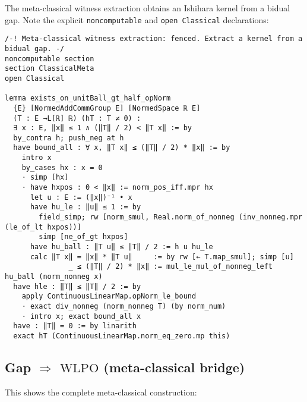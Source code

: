 \documentclass[11pt]{article}
\newcommand{\WLPO}{\mathrm{WLPO}}
\begin{document}
The meta-classical witness extraction obtains an Ishihara kernel from a bidual gap. Note the explicit \texttt{noncomputable} and \texttt{open Classical} declarations:

\begin{lstlisting}[caption={Meta-classical witness extraction from a bidual gap},label={lst:producer}]
/-! Meta-classical witness extraction: fenced. Extract a kernel from a bidual gap. -/
noncomputable section
section ClassicalMeta
open Classical

lemma exists_on_unitBall_gt_half_opNorm
  {E} [NormedAddCommGroup E] [NormedSpace ℝ E]
  (T : E →L[ℝ] ℝ) (hT : T ≠ 0) :
  ∃ x : E, ‖x‖ ≤ 1 ∧ (‖T‖ / 2) < ‖T x‖ := by
  by_contra h; push_neg at h
  have bound_all : ∀ x, ‖T x‖ ≤ (‖T‖ / 2) * ‖x‖ := by
    intro x
    by_cases hx : x = 0
    · simp [hx]
    · have hxpos : 0 < ‖x‖ := norm_pos_iff.mpr hx
      let u : E := (‖x‖)⁻¹ • x
      have hu_le : ‖u‖ ≤ 1 := by
        field_simp; rw [norm_smul, Real.norm_of_nonneg (inv_nonneg.mpr (le_of_lt hxpos))]
        simp [ne_of_gt hxpos]
      have hu_ball : ‖T u‖ ≤ ‖T‖ / 2 := h u hu_le
      calc ‖T x‖ = ‖x‖ * ‖T u‖     := by rw [← T.map_smul]; simp [u]
               _ ≤ (‖T‖ / 2) * ‖x‖ := mul_le_mul_of_nonneg_left hu_ball (norm_nonneg x)
  have hle : ‖T‖ ≤ ‖T‖ / 2 := by
    apply ContinuousLinearMap.opNorm_le_bound
    · exact div_nonneg (norm_nonneg T) (by norm_num)
    · intro x; exact bound_all x
  have : ‖T‖ = 0 := by linarith
  exact hT (ContinuousLinearMap.norm_eq_zero.mp this)
\end{lstlisting}

\subsection{Gap $\Rightarrow$ \texorpdfstring{$\WLPO$}{WLPO} (meta-classical bridge)}

This shows the complete meta-classical construction:
\end{document}
